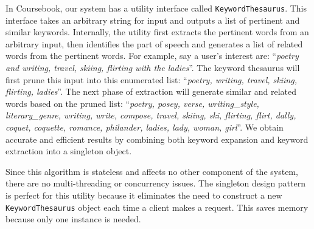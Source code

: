 In Coursebook, our system has a utility interface called
\verb!KeywordThesaurus!. This interface takes an arbitrary string for input and
outputs a list of pertinent and similar keywords. Internally, the utility first
extracts the pertinent words from an arbitrary input, then identifies the part
of speech and generates a list of related words from the pertinent words. For
example, say a user's interest are: ``\textit{poetry and writing, travel,
skiing, flirting with the ladies}''. The keyword thesaurus will first prune this
input into this enumerated list: ``\textit{poetry, writing, travel, skiing,
flirting, ladies}''. The next phase of extraction will generate similar and
related words based on the pruned list: ``\textit{poetry, posey, verse, 
writing\_style, literary\_genre, writing, write, compose, travel, skiing, ski,
flirting, flirt, dally, coquet, coquette, romance, philander, ladies, lady, 
woman, girl}''. We obtain accurate and efficient results by combining both
keyword expansion and keyword extraction into a singleton object.

Since this algorithm is stateless and affects no other component of the system,
there are no multi-threading or concurrency issues. The singleton design pattern
is perfect for this utility because it eliminates the need to construct a new
\verb!KeywordThesaurus! object each time a client makes a request. This saves
memory because only one instance is needed.
